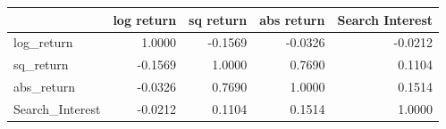 \begin{table}[htbp]
\centering
\begin{tabular}{lrrrr}
\toprule
 & log return & sq return & abs return & Search Interest \\
\midrule
log_return & 1.0000 & -0.1569 & -0.0326 & -0.0212 \\
sq_return & -0.1569 & 1.0000 & 0.7690 & 0.1104 \\
abs_return & -0.0326 & 0.7690 & 1.0000 & 0.1514 \\
Search_Interest & -0.0212 & 0.1104 & 0.1514 & 1.0000 \\
\bottomrule
\end{tabular}
\label{tab:correlation}
\end{table}
